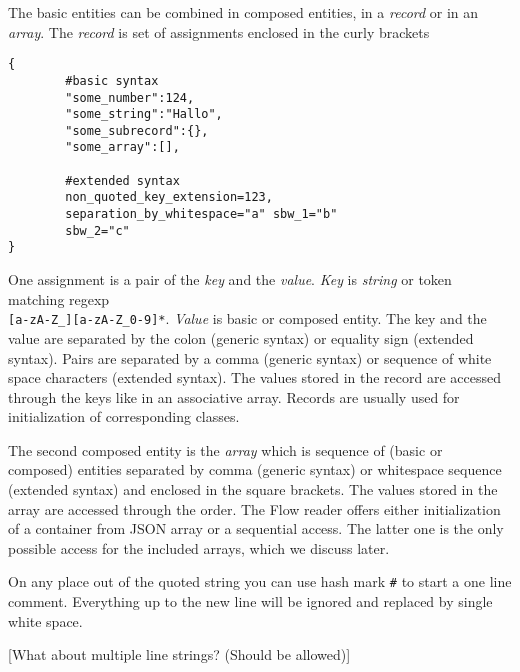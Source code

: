 The basic entities can be combined in composed entities, in a {\it record} or in an {\it array}. The {\it record} is set of assignments enclosed in the curly brackets
\begin{verbatim}
{
        #basic syntax
        "some_number":124, 
        "some_string":"Hallo",
        "some_subrecord":{},
        "some_array":[],
        
        #extended syntax
        non_quoted_key_extension=123,
        separation_by_whitespace="a" sbw_1="b"
        sbw_2="c"
}
\end{verbatim}
One assignment is a pair of the {\it key} and the {\it value}. {\it Key} is {\it string} or token matching regexp\\
\verb'[a-zA-Z_][a-zA-Z_0-9]*'.
{\it Value} is basic or composed entity.
The key and the value are separated by the colon (generic syntax) or equality sign (extended syntax). Pairs are separated by a comma (generic syntax) or 
sequence of white space characters (extended syntax). The values stored in the record are accessed through the keys like in an associative array. Records are usually used for initialization of corresponding classes.

The second composed entity is the {\it array} which is sequence of (basic or composed) entities separated by comma (generic syntax) or whitespace sequence 
(extended syntax) and enclosed in the square brackets. 
The values stored in the array are accessed through the order. The Flow reader offers either initialization of a container from JSON array or
a sequential access. The latter one is the only possible access for the included arrays, which we discuss later.

On any place out of the quoted string you can use hash mark \verb'#' 
to start a one line comment. Everything up to the new line will be ignored and replaced by single white space.

[What about multiple line strings? (Should be allowed)]

